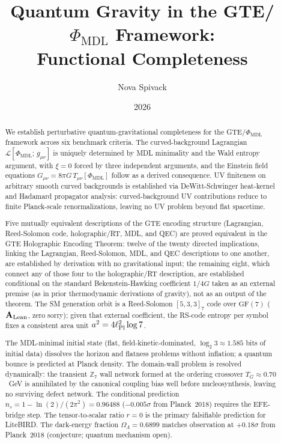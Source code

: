\documentclass[11pt]{article}
\theoremstyle{remark}
\newcommand{\PHIMDL}{\Phi_{\mathrm{MDL}}}
\newcommand{\CatAL}{\ensuremath{\textbf{A}_{\rm Lean}}}
\begin{document}
\title{\textbf{Quantum Gravity in the GTE/$\PHIMDL$ Framework:\\ Functional Completeness}}

\author{Nova Spivack}
\date{2026}
\maketitle

\NovaZenodoAfterTitle

\begin{abstract}
We establish perturbative quantum-gravitational completeness for the
GTE/$\PHIMDL$ framework across six benchmark criteria.
The curved-background Lagrangian $\mathcal{L}[\PHIMDL;\,g_{\mu\nu}]$ is
uniquely determined by MDL minimality and the Wald entropy argument, with
$\xi = 0$ forced by three independent arguments, and the Einstein field
equations $G_{\mu\nu} = 8\pi G\,T_{\mu\nu}[\PHIMDL]$ follow as a derived
consequence.
UV finiteness on arbitrary smooth curved backgrounds is established via
DeWitt-Schwinger heat-kernel and Hadamard propagator analysis: curved-background
UV contributions reduce to finite Planck-scale renormalizations, leaving no UV
problem beyond flat spacetime.

Five mutually equivalent descriptions of the GTE encoding structure
(Lagrangian, Reed-Solomon code, holographic/RT, MDL, and QEC) are proved
equivalent in the GTE Holographic Encoding Theorem: twelve of the twenty
directed implications, linking the Lagrangian, Reed-Solomon, MDL, and QEC
descriptions to one another, are established by derivation with no
gravitational input; the remaining eight, which connect any of those four to
the holographic/RT description, are established conditional on the standard
Bekenstein-Hawking coefficient $1/4G$ taken as an external premise (as in
prior thermodynamic derivations of gravity), not as an output of the theorem.
The SM generation orbit is a Reed-Solomon $[5,3,3]_7$ code over
$\mathrm{GF}(7)$ (\CatAL, zero sorry); given that external coefficient, the
RS-code entropy per symbol fixes a consistent area unit
$a^2 = 4\ell_{\rm Pl}^2\log 7$.

The MDL-minimal initial state (flat, field-kinetic-dominated, $\log_2 3 \approx 1.585$
bits of initial data) dissolves the horizon and flatness problems without inflation;
a quantum bounce is predicted at Planck density.
The domain-wall problem is resolved dynamically: the transient $\mathbb{Z}_7$ wall
network formed at the ordering crossover $T_G \approx 0.70$~GeV is annihilated by
the canonical coupling bias well before nucleosynthesis, leaving no surviving
defect network.
The conditional prediction $n_s = 1 - \ln(2)/(2\pi^2) = 0.96488$ ($-0.005\sigma$
from Planck~2018) requires the EFE-bridge step.
The tensor-to-scalar ratio $r = 0$ is the primary falsifiable prediction for LiteBIRD.
The dark-energy fraction $\Omega_\Lambda = 0.6899$ matches observation at
$+0.18\sigma$ from Planck~2018 (conjecture; quantum mechanism open).
\end{abstract}
\end{document}
